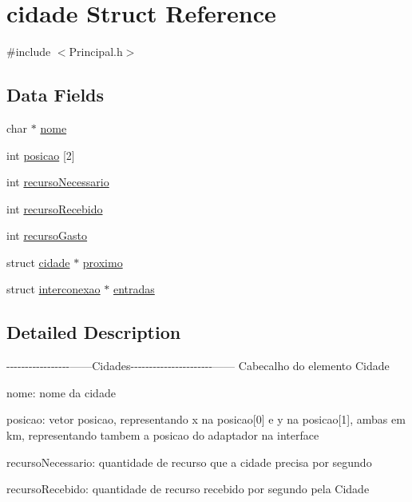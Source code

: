 \hypertarget{structcidade}{\section{cidade Struct Reference}
\label{structcidade}
}


{\ttfamily \#include $<$Principal.\-h$>$}

\subsection*{Data Fields}
\begin{DoxyCompactItemize}
\item 
char $\ast$ \hyperlink{structcidade_ae2a0f66178bb1c4d42e2b70ec9426ccb}{nome}
\item 
int \hyperlink{structcidade_a7e30d633898517077a4363ad6fade5b6}{posicao} \mbox{[}2\mbox{]}
\item 
int \hyperlink{structcidade_ae8b356353114803f6f5076a6b7bb411a}{recurso\-Necessario}
\item 
int \hyperlink{structcidade_a34541bd6c7eec1f2049716b02efe9572}{recurso\-Recebido}
\item 
int \hyperlink{structcidade_a4c30c9bf20d81925543c43abfaee74ac}{recurso\-Gasto}
\item 
struct \hyperlink{structcidade}{cidade} $\ast$ \hyperlink{structcidade_ac7a8c5f5dbf854099849bd3d9ab51517}{proximo}
\item 
struct \hyperlink{structinterconexao}{interconexao} $\ast$ \hyperlink{structcidade_ae28777a0a252764c89fe126c8d7fba4a}{entradas}
\end{DoxyCompactItemize}


\subsection{Detailed Description}
-\/-\/-\/-\/-\/-\/-\/-\/-\/-\/-\/-\/-\/-\/-\/-\/-\/------Cidades-\/-\/-\/-\/-\/-\/-\/-\/-\/-\/-\/-\/-\/-\/-\/-\/-\/-\/-\/-\/-\/-\/------ Cabecalho do elemento Cidade

nome\-: nome da cidade

posicao\-: vetor posicao, representando x na posicao\mbox{[}0\mbox{]} e y na posicao\mbox{[}1\mbox{]}, ambas em km, representando tambem a posicao do adaptador na interface

recurso\-Necessario\-: quantidade de recurso que a cidade precisa por segundo

recurso\-Recebido\-: quantidade de recurso recebido por segundo pela Cidade

